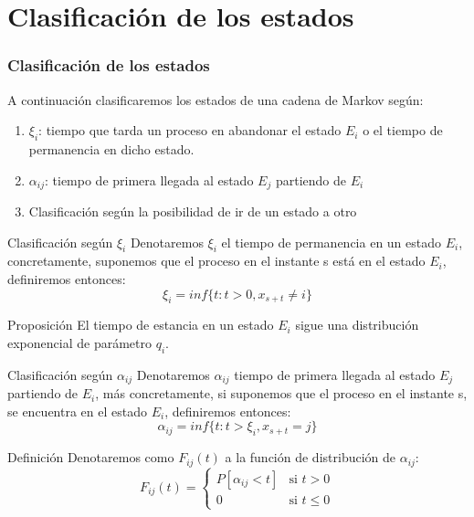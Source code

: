 \documentclass{beamer}
\begin{document}
\section{Clasificación de los estados}
\begin{frame}
    \frametitle{Clasificación de los estados}
    A continuación clasificaremos los estados de una cadena de Markov según:
	\begin{enumerate}
		\item $\xi_{i}$: tiempo que tarda un proceso en abandonar el estado $E_{i}$ o el tiempo de permanencia en dicho estado.
		\item $\alpha_{ij}$: tiempo de primera llegada al estado $E_{j}$ partiendo de $E_{i}$
		\item Clasificación según la posibilidad de ir de un estado a otro
	\end{enumerate}
\end{frame}
\begin{frame}{Clasificación según $\xi_{i}$}
 Denotaremos $\xi_{i}$ el tiempo de permanencia en un estado $E_{i}$, concretamente, suponemos que el proceso en el instante s está en el estado $E_{i}$, definiremos entonces:
 \begin{equation*}
	\xi_{i}=inf \{ t:t > 0, x_{s+t}\neq i \}
\end{equation*}
\begin{block}{Proposición}
El tiempo de estancia en un estado $E_{i}$ sigue una distribución exponencial de parámetro $q_{i}$.
\end{block}
\end{frame}
\begin{frame}{Clasificación según $\alpha_{ij}$}
Denotaremos $\alpha_{ij}$ tiempo de primera llegada al estado $E_{j}$ partiendo de $E_{i}$, más concretamente, si suponemos que el proceso en el instante s, se encuentra en el estado $E_{i}$, definiremos entonces: 
	 \begin{equation*}
 \alpha_{ij}=inf \{ t: t>\xi_{i}, x_{s+t}=j \}
	 \end{equation*}
 \begin{block}{Definición}
Denotaremos como $F_{ij}(t)$ a la función de distribución de $\alpha_{ij}$:
 	\begin{equation*}
 		F_{ij}(t) = \left\{
 		\begin{array}{cl}
 			P[\alpha_{ij}<t]&\mbox{si } t > 0\\
 			0&\mbox{si } t\leq 0
 		\end{array}\right.
 	\end{equation*}
 \end{block}
\end{frame}
\end{document}
